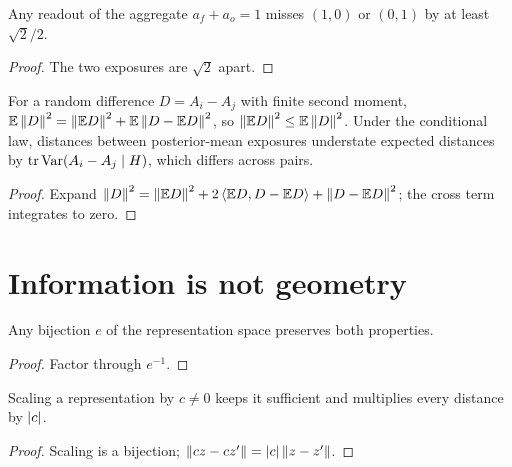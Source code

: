 \begin{corollary}\label{thm:measurement-aggregate}
  \leanok
  Any readout of the aggregate $a_f+a_o=1$ misses $(1,0)$ or $(0,1)$ by at
  least $\sqrt2/2$.
\end{corollary}
\begin{proof}\leanok
  The two exposures are $\sqrt2$ apart.
\end{proof}

\begin{theorem}\label{thm:measurement-mean-sq}
  \leanok
  For a random difference $D=A_i-A_j$ with finite second moment,
  $\mathbb{E}\left\lVert D\right\rVert^2=\left\lVert\mathbb{E} D\right\rVert^2+\mathbb{E}\left\lVert D-\mathbb{E} D\right\rVert^2$, so
  $\left\lVert\mathbb{E} D\right\rVert^2\le\mathbb{E}\left\lVert D\right\rVert^2$. Under the conditional law, distances between
  posterior-mean exposures understate expected distances by
  $\operatorname{tr}\operatorname{Var}(A_i-A_j\mid H)$, which differs across pairs.
\end{theorem}
\begin{proof}\leanok
  Expand $\left\lVert D\right\rVert^2=\left\lVert\mathbb{E} D\right\rVert^2+2\left\langle\mathbb{E} D,D-\mathbb{E} D\right\rangle+\left\lVert D-\mathbb{E} D\right\rVert^2$; the
  cross term integrates to zero.
\end{proof}

\section{Information is not geometry}\label{sec:bp-geometry}

\begin{lemma}\label{thm:geometry-equiv}
  \leanok
  Any bijection $e$ of the representation space preserves both properties.
\end{lemma}
\begin{proof}\leanok
  Factor through $e^{-1}$.
\end{proof}

\begin{theorem}\label{thm:geometry-rescale}
  \leanok
  Scaling a representation by $c\ne0$ keeps it sufficient and multiplies every
  distance by $\left\lvert c\right\rvert$.
\end{theorem}
\begin{proof}\leanok
  Scaling is a bijection; $\left\lVert cz-cz'\right\rVert=\left\lvert c\right\rvert\left\lVert z-z'\right\rVert$.
\end{proof}

